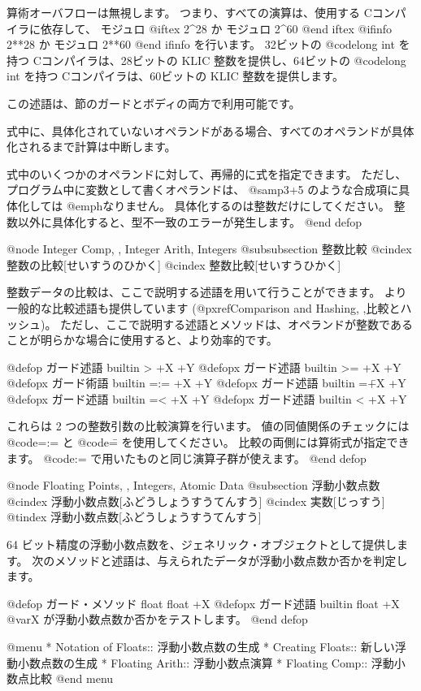 {{算術オーバフローは無視します。
つまり、すべての演算は、使用する Cコンパイラに依存して、
モジュロ 
@iftex  
2^{28} か モジュロ 2^{60} 
@end iftex 
@ifinfo 
2**28 か モジュロ 2**60 
@end ifinfo 
を行います。
32ビットの @code{long int} を持つ Cコンパイラは、28ビットの KLIC 整数を提供し、64ビットの @code{long int} を持つ Cコンパイラは、60ビットの KLIC 整数を提供します。

この述語は、節のガードとボディの両方で利用可能です。

式中に、具体化されていないオペランドがある場合、すべてのオペランドが具体化されるまで計算は中断します。

式中のいくつかのオペランドに対して、再帰的に式を指定できます。
ただし、プログラム中に変数として書くオペランドは、 @samp{3+5} のような合成項に具体化しては @emph{なりません}。
具体化するのは整数だけにしてください。
整数以外に具体化すると、型不一致のエラーが発生します。
@end defop

@node Integer Comp,  , Integer Arith, Integers
@subsubsection 整数比較
@cindex 整数の比較[せいすうのひかく]
@cindex 整数比較[せいすうひかく]

整数データの比較は、ここで説明する述語を用いて行うことができます。
より一般的な比較述語も提供しています
(@pxref{Comparison and Hashing, ,比較とハッシュ})。
ただし、ここで説明する述語とメソッドは、オペランドが整数であることが明らかな場合に使用すると、より効率的です。

@defop {ガード述語} {builtin} > +X +Y
@defopx {ガード述語} {builtin} >= +X +Y
@defopx {ガード術語} {builtin} =:= +X +Y
@defopx {ガード述語} {builtin} =\= +X +Y
@defopx {ガード述語} {builtin} =< +X +Y
@defopx {ガード述語} {builtin} < +X +Y

これらは 2 つの整数引数の比較演算を行います。
値の同値関係のチェックには @code{=:=} と @code{=\=} を使用してください。
比較の両側には算術式が指定できます。
@code{:=} で用いたものと同じ演算子群が使えます。
@end defop 

@node Floating Points,  , Integers, Atomic Data
@subsection 浮動小数点数
@cindex 浮動小数点数[ふどうしょうすうてんすう]
@cindex 実数[じっすう]
@tindex 浮動小数点数[ふどうしょうすうてんすう]

64 ビット精度の浮動小数点数を、ジェネリック・オブジェクトとして提供します。
次のメソッドと述語は、与えられたデータが浮動小数点数か否かを判定します。

@defop {ガード・メソッド} {float} float +X
@defopx {ガード述語} {builtin} float +X
@var{X} が浮動小数点数か否かをテストします。
@end defop

@menu
* Notation of Floats::          浮動小数点数の生成
* Creating Floats::             新しい浮動小数点数の生成
* Floating Arith::              浮動小数点演算
* Floating Comp::               浮動小数点比較
@end menu

}}
